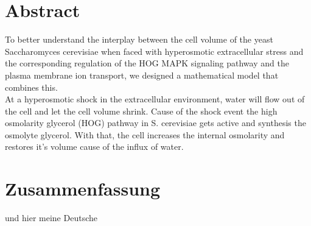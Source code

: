 \section{Abstract}
To better understand the interplay between the cell volume of the yeast Saccharomyces cerevisiae when faced with hyperosmotic extracellular stress and the corresponding regulation of the HOG MAPK signaling pathway and the plasma membrane ion transport, we designed a mathematical model that combines this.  \\
At a hyperosmotic shock in the extracellular environment, water will flow out of the cell and let the cell volume shrink. Cause of the shock event the high osmolarity glycerol (HOG) pathway in S. cerevisiae gets active and synthesis the osmolyte glycerol. With that, the cell increases the internal osmolarity and restores it’s volume cause of the influx of water.

\section{Zusammenfassung}
und hier meine Deutsche
\newpage
